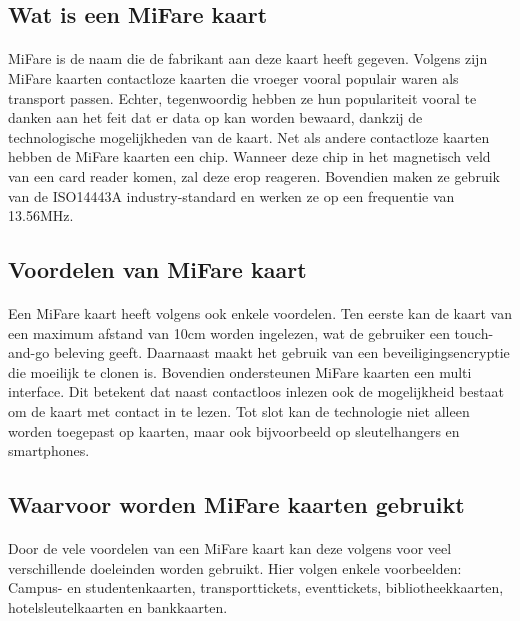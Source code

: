 \bigskip
\subsection{Wat is een MiFare kaart}
\paragraph{}
MiFare is de naam die de fabrikant aan deze kaart heeft gegeven. Volgens \textcite{Digitalid} zijn MiFare kaarten contactloze kaarten die vroeger vooral populair waren als transport passen. Echter, tegenwoordig hebben ze hun populariteit vooral te danken aan het feit dat er data op kan worden bewaard, dankzij de technologische mogelijkheden van de kaart.
Net als andere contactloze kaarten hebben de MiFare kaarten een chip. Wanneer deze chip in het magnetisch veld van een card reader komen, zal deze erop reageren. Bovendien maken ze gebruik van de ISO14443A industry-standard en werken ze op een frequentie van 13.56MHz.

\bigskip
\subsection{Voordelen van MiFare kaart}
\paragraph{}
Een MiFare kaart heeft volgens \textcite{Printplast} ook enkele voordelen. Ten eerste kan de kaart van een maximum afstand van 10cm worden ingelezen, wat de gebruiker een touch-and-go beleving geeft.
Daarnaast maakt het gebruik van een beveiligingsencryptie die moeilijk te clonen is. Bovendien ondersteunen MiFare kaarten een multi interface. Dit betekent dat naast contactloos inlezen ook de mogelijkheid bestaat om de kaart met contact in te lezen. Tot slot kan de technologie niet alleen worden toegepast op kaarten, maar ook bijvoorbeeld op sleutelhangers en smartphones.

\bigskip
\subsection{Waarvoor worden MiFare kaarten gebruikt}
\paragraph{}
Door de vele voordelen van een MiFare kaart kan deze volgens \textcite{Digitalid} voor veel verschillende doeleinden worden gebruikt. Hier volgen enkele voorbeelden: Campus- en studentenkaarten, transporttickets, eventtickets, bibliotheekkaarten, hotelsleutelkaarten en bankkaarten.

